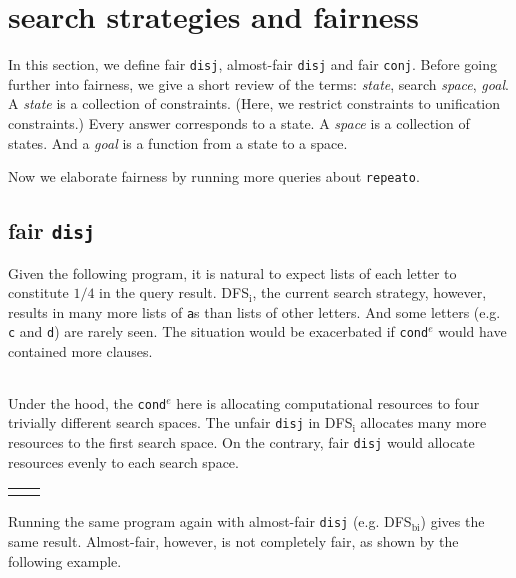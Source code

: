 \documentclass[format=acmlarge, review=true, authordraft=true]{acmart}
\newcommand{\conde}{\texttt{cond$^e$}}
\newcommand{\conj}{\texttt{conj}}
\newcommand{\disj}{\texttt{disj}}
\newcommand{\DFSi }[0]{DFS$_\textrm{i}$}
\begin{document}
\section{search strategies and fairness}

In this section, we define fair \disj{}, almost-fair \disj{} and fair \conj{}. 
Before going further into fairness, we give a short review of the terms:
\emph{state}, search \emph{space}, \emph{goal}.
A \emph{state} is a collection of constraints. (Here, we restrict 
constraints to unification constraints.) Every answer corresponds to a 
state. A \emph{space} is a collection of states. And a \emph{goal} is a 
function from a state to a space.

Now we elaborate fairness by running more queries about \texttt{repeato}.

\subsection{fair \texttt{disj}}

Given the following program, it is natural to expect lists of each letter to
constitute $1/4$ in the query result. \DFSi, the current search
strategy, however, results in many more lists of \texttt{a}s than lists
of other letters. And some letters  (e.g. \texttt{c} and \texttt{d}) are
rarely seen. The situation would be exacerbated if \conde{} would have
contained more clauses.

\begin{center}
	\begin{tabular}{c}
		
	\end{tabular}
\end{center}

Under the hood, the \conde{} here is allocating computational resources to 
four trivially different search spaces. The unfair \disj{} in 
\DFSi{} allocates many more resources to the first search space. On the 
contrary, fair \disj{} would allocate resources evenly to each search space. 

\begin{center}
	\begin{tabular}{l|r}
		 &
		
	\end{tabular}
\end{center}

Running the same program again with almost-fair \disj {} (e.g. 
DFS$_\textrm{bi}$) gives the same result. Almost-fair, however, is not 
completely fair, as shown by the following example. 
\end{document}
